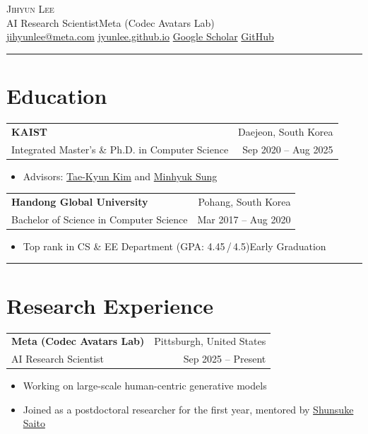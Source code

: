 \documentclass[10.5pt,a4paper]{article}
\makeatletter
\newcommand{\sep}{{\color{gray}\;\textbullet\;\;}}
\newcommand{\hsep}{\noindent\textcolor{gray!40}{\rule{\textwidth}{0.5pt}}\vspace{4pt}}
\newcommand{\cventry}[4]{%
  \noindent\begin{tabularx}{\textwidth}{@{}X r@{}}
    \textbf{#1} & {\footnotesize\color{gray} #2} \\[1pt]
    {\small\color{gray}#3} & {\footnotesize\color{gray} #4}
  \end{tabularx}\vspace{1pt}%
}
\makeatother
\begin{document}
\begin{center}
  {\fontsize{24}{28}\selectfont\scshape Jihyun Lee} \\[8pt]
  {\small\color{gray}
    AI Research Scientist\sep Meta (Codec Avatars Lab)} \\[6pt]
  {\footnotesize\color{gray}
    \href{mailto:jihyunlee@meta.com}{jihyunlee@meta.com}
    \sep
    \href{https://jyunlee.github.io}{jyunlee.github.io}
    \sep
    \href{https://scholar.google.com/citations?user=UaMiOq8AAAAJ}{Google Scholar}
    \sep
    \href{https://github.com/jyunlee}{GitHub}
  }
\end{center}

\vspace{4pt}

\hsep
\section{Education}

\cventry{KAIST}{Daejeon, South Korea}{Integrated Master's \& Ph.D. in Computer Science}{Sep 2020 -- Aug 2025}
\begin{itemize}
  \item Advisors: \href{https://sites.google.com/view/tkkim/home}{Tae-Kyun Kim} and \href{https://mhsung.github.io/}{Minhyuk Sung}
\end{itemize}

\vspace{6pt}

\cventry{Handong Global University}{Pohang, South Korea}{Bachelor of Science in Computer Science}{Mar 2017 -- Aug 2020}
\begin{itemize}
  \item Top rank in CS \& EE Department (GPA: 4.45\,/\,4.5)\sep Early Graduation
\end{itemize}

\hsep
\section{Research Experience}

\cventry{Meta (Codec Avatars Lab)}{Pittsburgh, United States}{AI Research Scientist}{Sep 2025 -- Present}
\begin{itemize}
  \item Working on large-scale human-centric generative models
  \item Joined as a postdoctoral researcher for the first year, mentored by \href{https://shunsukesaito.github.io/}{Shunsuke Saito}
\end{itemize}
\end{document}
